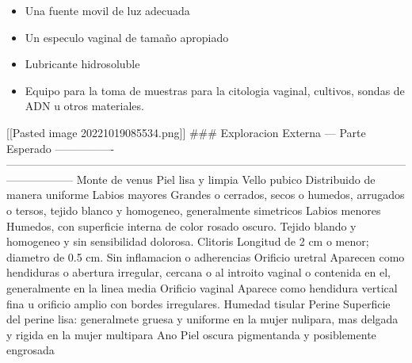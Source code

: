 \documentclass[
]{article}
\providecommand{\tightlist}{%
  \setlength{\itemsep}{0pt}\setlength{\parskip}{0pt}}
\begin{document}
\begin{itemize}
\tightlist
\item
  Una fuente movil de luz adecuada
\item
  Un especulo vaginal de tamaño apropiado
\item
  Lubricante hidrosoluble
\item
  Equipo para la toma de muestras para la citologia vaginal, cultivos,
  sondas de ADN u otros materiales.
\end{itemize}

{[}{[}Pasted image 20221019085534.png{]}{]} \#\#\# Exploracion Externa
--- \textbar{} Parte \textbar{} Esperado \textbar{} \textbar{}
---------------- \textbar{}
------------------------------------------------------------------------------------------------------------------------------
\textbar{} \textbar{} Monte de venus \textbar{} Piel lisa y limpia
\textbar{} \textbar{} Vello pubico \textbar{} Distribuido de manera
uniforme \textbar{} \textbar{} Labios mayores \textbar{} Grandes o
cerrados, secos o humedos, arrugados o tersos, tejido blanco y
homogeneo, generalmente simetricos \textbar{} \textbar{} Labios menores
\textbar{} Humedos, con superficie interna de color rosado oscuro.
Tejido blando y homogeneo y sin sensibilidad dolorosa. \textbar{}
\textbar{} Clitoris \textbar{} Longitud de 2 cm o menor; diametro de 0.5
cm. Sin inflamacion o adherencias \textbar{} \textbar{} Orificio uretral
\textbar{} Aparecen como hendiduras o abertura irregular, cercana o al
introito vaginal o contenida en el, generalmente en la linea media
\textbar{} \textbar{} Orificio vaginal \textbar{} Aparece como hendidura
vertical fina u orificio amplio con bordes irregulares. Humedad tisular
\textbar{} \textbar{} Perine \textbar{} Superficie del perine lisa:
generalmete gruesa y uniforme en la mujer nulipara, mas delgada y rigida
en la mujer multipara \textbar{} \textbar{} Ano \textbar{} Piel oscura
pigmentanda y posiblemente engrosada \textbar{}
\end{document}
